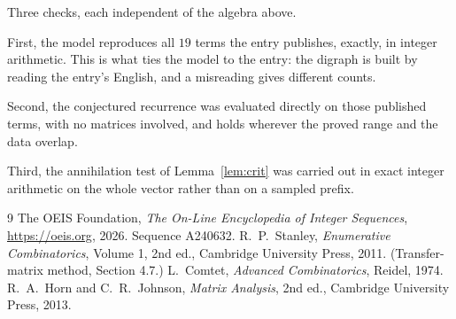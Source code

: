 \documentclass[11pt,a4paper]{article}
\theoremstyle{plain}
\theoremstyle{definition}
\begin{document}
Three checks, each independent of the algebra above.

First, the model reproduces all $19$ terms the entry publishes, exactly, in integer
arithmetic. This is what ties the model to the entry: the digraph is built by reading the
entry's English, and a misreading gives different counts.

Second, the conjectured recurrence was evaluated directly on those published terms, with no
matrices involved, and holds wherever the proved range and the data overlap.

Third, the annihilation test of Lemma~\ref{lem:crit} was carried out in exact integer
arithmetic on the whole vector rather than on a sampled prefix.

\begin{thebibliography}{9}
 The OEIS Foundation, \emph{The On-Line Encyclopedia of Integer
Sequences}, \url{https://oeis.org}, 2026. Sequence A240632.
 R.~P.~Stanley, \emph{Enumerative Combinatorics}, Volume 1, 2nd ed.,
Cambridge University Press, 2011. (Transfer-matrix method, Section 4.7.)
 L.~Comtet, \emph{Advanced Combinatorics}, Reidel, 1974.
 R.~A.~Horn and C.~R.~Johnson, \emph{Matrix Analysis}, 2nd ed., Cambridge
University Press, 2013.
\end{thebibliography}
\end{document}

